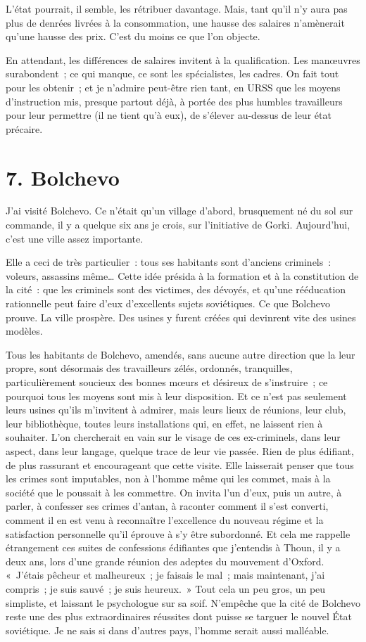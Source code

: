 \documentclass[twoside]{book} %
\begin{document}
L’état pourrait, il semble, les rétribuer davantage. Mais, tant qu’il n’y aura pas plus de denrées livrées à la consommation, une hausse des salaires n’amènerait qu’une hausse des prix. C’est du moins ce que l’on objecte.\par
En attendant, les différences de salaires invitent à la qualification. Les manœuvres surabondent ; ce qui manque, ce sont les spécialistes, les cadres. On fait tout pour les obtenir ; et je n’admire peut-être rien tant, en URSS que les moyens d’instruction mis, presque partout déjà, à portée des plus humbles travailleurs pour leur permettre (il ne tient qu’à eux), de s’élever au-dessus de leur état précaire.

\section[{7. Bolchevo}]{7. Bolchevo}

\noindent J’ai visité Bolchevo. Ce n’était qu’un village d’abord, brusquement né du sol sur commande, il y a quelque six ans je crois, sur l’initiative de Gorki. Aujourd’hui, c’est une ville assez importante.\par
Elle a ceci de très particulier : tous ses habitants sont d’anciens criminels : voleurs, assassins même… Cette idée présida à la formation et à la constitution de la cité : que les criminels sont des victimes, des dévoyés, et qu’une rééducation rationnelle peut faire d’eux d’excellents sujets soviétiques. Ce que Bolchevo prouve. La ville prospère. Des usines y furent créées qui devinrent vite des usines modèles.\par
Tous les habitants de Bolchevo, amendés, sans aucune autre direction que la leur propre, sont désormais des travailleurs zélés, ordonnés, tranquilles, particulièrement soucieux des bonnes mœurs et désireux de s’instruire ; ce pourquoi tous les moyens sont mis à leur disposition. Et ce n’est pas seulement leurs usines qu’ils m’invitent à admirer, mais leurs lieux de réunions, leur club, leur bibliothèque, toutes leurs installations qui, en effet, ne laissent rien à souhaiter. L’on chercherait en vain sur le visage de ces ex-criminels, dans leur aspect, dans leur langage, quelque trace de leur vie passée. Rien de plus édifiant, de plus rassurant et encourageant que cette visite. Elle laisserait penser que tous les crimes sont imputables, non à l’homme même qui les commet, mais à la société que le poussait à les commettre. On invita l’un d’eux, puis un autre, à parler, à confesser ses crimes d’antan, à raconter comment il s’est converti, comment il en est venu à reconnaître l’excellence du nouveau régime et la satisfaction personnelle qu’il éprouve à s’y être subordonné. Et cela me rappelle étrangement ces suites de confessions édifiantes que j’entendis à Thoun, il y a deux ans, lors d’une grande réunion des adeptes du mouvement d’Oxford. « J’étais pêcheur et malheureux ; je faisais le mal ; mais maintenant, j’ai compris ; je suis sauvé ; je suis heureux. » Tout cela un peu gros, un peu simpliste, et laissant le psychologue sur sa soif. N’empêche que la cité de Bolchevo reste une des plus extraordinaires réussites dont puisse se targuer le nouvel État soviétique. Je ne sais si dans d’autres pays, l’homme serait aussi malléable.
\end{document}
